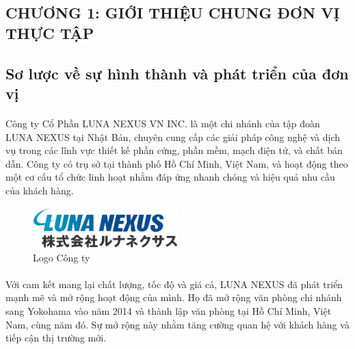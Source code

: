 	\pagestyle{fancy}
	\fancyhf{}
	\fancyfoot[R]{\thepage}
	\begin{center}
		\setcounter{page}{2}
	\end{center}
	
	\begin{flushleft}
		
		\fontsize{16}{20}\selectfont
		\section*{CHƯƠNG 1: GIỚI THIỆU CHUNG ĐƠN VỊ THỰC TẬP }
		\fontsize{13}{13}\selectfont
        \setcounter{section}{1}

		\subsection{Sơ lược về sự hình thành và phát triển của đơn vị}
		\paragraph{}
		Công ty Cổ Phần LUNA NEXUS VN INC. là một chi nhánh của tập đoàn LUNA NEXUS tại Nhật Bản, chuyên cung cấp các giải pháp công nghệ và dịch vụ trong các lĩnh vực thiết kế phần cứng, phần mềm, mạch điện tử, và chất bán dẫn. Công ty có trụ sở tại thành phố Hồ Chí Minh, Việt Nam, và hoạt động theo một cơ cấu tổ chức linh hoạt nhằm đáp ứng nhanh chóng và hiệu quả nhu cầu của khách hàng.

		\begin{figure}[h]
			\centering
			\includegraphics[width=0.5\textwidth]{images/logo_luna_nexus.png}
			\caption{Logo Công ty}
			\label{fig:logo_cong_ty}
		\end{figure}
		\paragraph{}
		\fontsize{16}{13}\selectfont Với cam kết mang lại chất lượng, tốc độ và giá cả, LUNA NEXUS đã phát triển mạnh mẽ và mở rộng hoạt động của mình. Họ đã mở rộng văn phòng chi nhánh sang Yokohama vào năm 2014 và thành lập văn phòng tại Hồ Chí Minh, Việt Nam, cùng năm đó. Sự mở rộng này nhằm tăng cường quan hệ với khách hàng và tiếp cận thị trường mới.

\end{flushleft}

